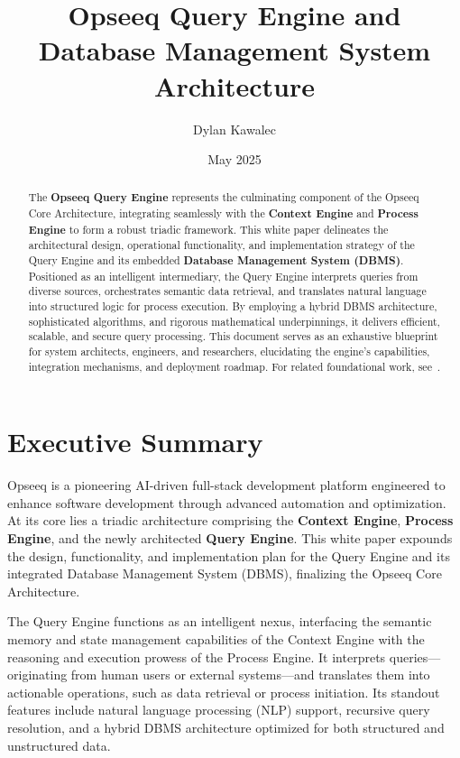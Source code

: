 \documentclass[11pt]{article}
\title{Opseeq Query Engine and Database Management System Architecture}
\author{Dylan Kawalec}
\date{May 2025}
\begin{document}
\maketitle

\begin{abstract}
The \textbf{Opseeq Query Engine} represents the culminating component of the Opseeq Core Architecture, integrating seamlessly with the \textbf{Context Engine} and \textbf{Process Engine} to form a robust triadic framework. This white paper delineates the architectural design, operational functionality, and implementation strategy of the Query Engine and its embedded \textbf{Database Management System (DBMS)}. Positioned as an intelligent intermediary, the Query Engine interprets queries from diverse sources, orchestrates semantic data retrieval, and translates natural language into structured logic for process execution. By employing a hybrid DBMS architecture, sophisticated algorithms, and rigorous mathematical underpinnings, it delivers efficient, scalable, and secure query processing. This document serves as an exhaustive blueprint for system architects, engineers, and researchers, elucidating the engine’s capabilities, integration mechanisms, and deployment roadmap. For related foundational work, see~\cite{Kawalec2025}.
\end{abstract}

\section{Executive Summary}
\label{sec:executive_summary}


Opseeq is a pioneering AI-driven full-stack development platform engineered to enhance software development through advanced automation and optimization. At its core lies a triadic architecture comprising the \textbf{Context Engine}, \textbf{Process Engine}, and the newly architected \textbf{Query Engine}. This white paper expounds the design, functionality, and implementation plan for the Query Engine and its integrated Database Management System (DBMS), finalizing the Opseeq Core Architecture.

The Query Engine functions as an intelligent nexus, interfacing the semantic memory and state management capabilities of the Context Engine with the reasoning and execution prowess of the Process Engine. It interprets queries—originating from human users or external systems—and translates them into actionable operations, such as data retrieval or process initiation. Its standout features include natural language processing (NLP) support, recursive query resolution, and a hybrid DBMS architecture optimized for both structured and unstructured data.
\end{document}
